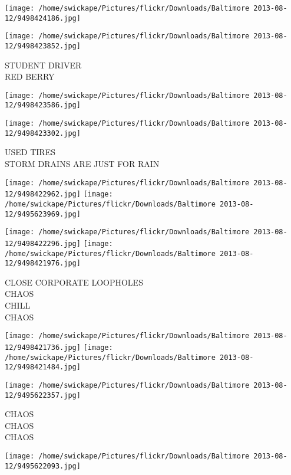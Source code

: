 \documentclass[10pt,letterpaper]{article}
\begin{document}
\texttt{[image: /home/swickape/Pictures/flickr/Downloads/Baltimore 2013-08-12/9498424186.jpg]}

\vspace{0.25in}
\texttt{[image: /home/swickape/Pictures/flickr/Downloads/Baltimore 2013-08-12/9498423852.jpg]}

STUDENT DRIVER\\
RED BERRY\\
\pagebreak

\texttt{[image: /home/swickape/Pictures/flickr/Downloads/Baltimore 2013-08-12/9498423586.jpg]}

\vspace{0.25in}
\texttt{[image: /home/swickape/Pictures/flickr/Downloads/Baltimore 2013-08-12/9498423302.jpg]}

USED TIRES\\
STORM DRAINS ARE JUST FOR RAIN\\
\pagebreak

\texttt{[image: /home/swickape/Pictures/flickr/Downloads/Baltimore 2013-08-12/9498422962.jpg]}
\texttt{[image: /home/swickape/Pictures/flickr/Downloads/Baltimore 2013-08-12/9495623969.jpg]}

\texttt{[image: /home/swickape/Pictures/flickr/Downloads/Baltimore 2013-08-12/9498422296.jpg]}
\texttt{[image: /home/swickape/Pictures/flickr/Downloads/Baltimore 2013-08-12/9498421976.jpg]}

CLOSE CORPORATE LOOPHOLES\\
CHAOS\\
CHILL\\
CHAOS\\
\pagebreak

\texttt{[image: /home/swickape/Pictures/flickr/Downloads/Baltimore 2013-08-12/9498421736.jpg]}
\texttt{[image: /home/swickape/Pictures/flickr/Downloads/Baltimore 2013-08-12/9498421484.jpg]}

\texttt{[image: /home/swickape/Pictures/flickr/Downloads/Baltimore 2013-08-12/9495622357.jpg]}

CHAOS\\
CHAOS\\
CHAOS\\
\pagebreak

\texttt{[image: /home/swickape/Pictures/flickr/Downloads/Baltimore 2013-08-12/9495622093.jpg]}
\end{document}
